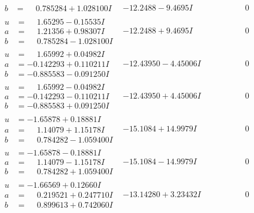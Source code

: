 \documentclass[1p]{elsarticle_modified}
\theoremstyle{definition}
\begin{document}
$$\begin{array}{c|c|c}
\begin{aligned}
b &= \phantom{-}0.785284 + 1.028100 I\end{aligned}
 & -12.2488 - 9.4695 I & \phantom{-0.000000 } 0 \\ \hline\begin{aligned}
u &= \phantom{-}1.65295 - 0.15535 I \\
a &= \phantom{-}1.21356 + 0.98307 I \\
b &= \phantom{-}0.785284 - 1.028100 I\end{aligned}
 & -12.2488 + 9.4695 I & \phantom{-0.000000 } 0 \\ \hline\begin{aligned}
u &= \phantom{-}1.65992 + 0.04982 I \\
a &= -0.142293 + 0.110211 I \\
b &= -0.885583 - 0.091250 I\end{aligned}
 & -12.43950 - 4.45006 I & \phantom{-0.000000 } 0 \\ \hline\begin{aligned}
u &= \phantom{-}1.65992 - 0.04982 I \\
a &= -0.142293 - 0.110211 I \\
b &= -0.885583 + 0.091250 I\end{aligned}
 & -12.43950 + 4.45006 I & \phantom{-0.000000 } 0 \\ \hline\begin{aligned}
u &= -1.65878 + 0.18881 I \\
a &= \phantom{-}1.14079 + 1.15178 I \\
b &= \phantom{-}0.784282 - 1.059400 I\end{aligned}
 & -15.1084 + 14.9979 I & \phantom{-0.000000 } 0 \\ \hline\begin{aligned}
u &= -1.65878 - 0.18881 I \\
a &= \phantom{-}1.14079 - 1.15178 I \\
b &= \phantom{-}0.784282 + 1.059400 I\end{aligned}
 & -15.1084 - 14.9979 I & \phantom{-0.000000 } 0 \\ \hline\begin{aligned}
u &= -1.66569 + 0.12660 I \\
a &= \phantom{-}0.219521 + 0.247710 I \\
b &= \phantom{-}0.899613 + 0.742060 I\end{aligned}
 & -13.14280 + 3.23432 I & \phantom{-0.000000 } 0 \\ \hline\begin{aligned}

\end{aligned}
\end{array}$$
\end{document}
